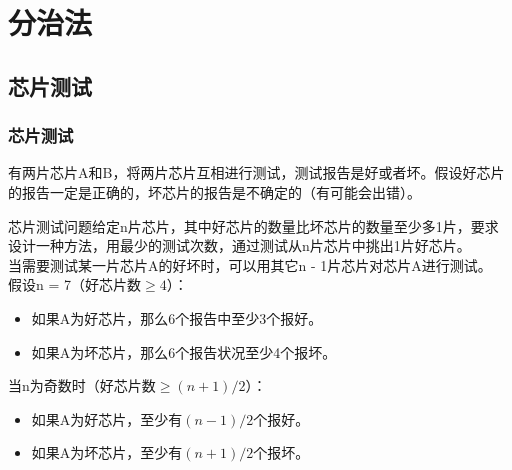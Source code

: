 \chapter{分治法}

\section{芯片测试}

\subsection{芯片测试}

有两片芯片A和B，将两片芯片互相进行测试，测试报告是好或者坏。假设好芯片的报告一定是正确的，坏芯片的报告是不确定的（有可能会出错）。

\begin{table}[H]
	\centering
	\caption{测试结果}
\end{table}

芯片测试问题给定n片芯片，其中好芯片的数量比坏芯片的数量至少多1片，要求设计一种方法，用最少的测试次数，通过测试从n片芯片中挑出1片好芯片。\\

当需要测试某一片芯片A的好坏时，可以用其它n - 1片芯片对芯片A进行测试。\\

假设n = 7（好芯片数$ \ge 4 $）：

\begin{itemize}
	\item 如果A为好芯片，那么6个报告中至少3个报好。
	\item 如果A为坏芯片，那么6个报告状况至少4个报坏。
\end{itemize}

当n为奇数时（好芯片数$ \ge (n + 1) / 2 $）：

\begin{itemize}
	\item 如果A为好芯片，至少有$ (n-1) / 2 $个报好。
	\item 如果A为坏芯片，至少有$ (n+1) / 2 $个报坏。
\end{itemize}

